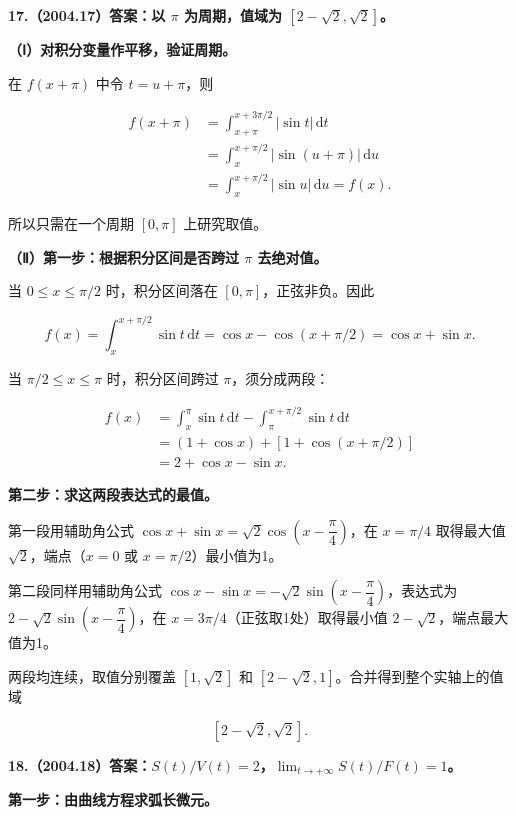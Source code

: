 \documentclass[UTF8,11pt,fontset=windows]{ctexart}
\begin{document}
\clearpage

\textbf{17.（2004.17）答案：以 $\pi$ 为周期，值域为 $[2-\sqrt2,\sqrt2]$。}

\textbf{（Ⅰ）对积分变量作平移，验证周期。}

在 $f(x+\pi)$ 中令 $t=u+\pi$，则

$$
\begin{aligned}
f(x+\pi)
&=\int_{x+\pi}^{x+3\pi/2}|\sin t|\,\mathrm dt\\
&=\int_x^{x+\pi/2}|\sin(u+\pi)|\,\mathrm du\\
&=\int_x^{x+\pi/2}|\sin u|\,\mathrm du=f(x).
\end{aligned}
$$

所以只需在一个周期 $[0,\pi]$ 上研究取值。

\textbf{（Ⅱ）第一步：根据积分区间是否跨过 $\pi$ 去绝对值。}

当 $0\le x\le\pi/2$ 时，积分区间落在 $[0,\pi]$，正弦非负。因此

$$
f(x)=\int_x^{x+\pi/2}\sin t\,\mathrm dt
=\cos x-\cos(x+\pi/2)
=\cos x+\sin x.
$$

当 $\pi/2\le x\le\pi$ 时，积分区间跨过 $\pi$，须分成两段：

$$
\begin{aligned}
f(x)&=\int_x^\pi\sin t\,\mathrm dt
-\int_\pi^{x+\pi/2}\sin t\,\mathrm dt\\
&=(1+\cos x)+[1+\cos(x+\pi/2)]\\
&=2+\cos x-\sin x.
\end{aligned}
$$

\textbf{第二步：求这两段表达式的最值。}

第一段用辅助角公式 $\cos x+\sin x=\sqrt2\cos\left(x-\dfrac\pi4\right)$，在 $x=\pi/4$ 取得最大值 $\sqrt2$，端点（$x=0$ 或 $x=\pi/2$）最小值为1。

第二段同样用辅助角公式 $\cos x-\sin x=-\sqrt2\sin\left(x-\dfrac\pi4\right)$，表达式为 $2-\sqrt2\sin\left(x-\dfrac\pi4\right)$，在 $x=3\pi/4$（正弦取1处）取得最小值 $2-\sqrt2$，端点最大值为1。

两段均连续，取值分别覆盖 $[1,\sqrt2]$ 和 $[2-\sqrt2,1]$。合并得到整个实轴上的值域

$$
[2-\sqrt2,\sqrt2].
$$

\clearpage

\textbf{18.（2004.18）答案：$S(t)/V(t)=2$，$\displaystyle\lim_{t\to+\infty}S(t)/F(t)=1$。}

\textbf{第一步：由曲线方程求弧长微元。}
\end{document}
